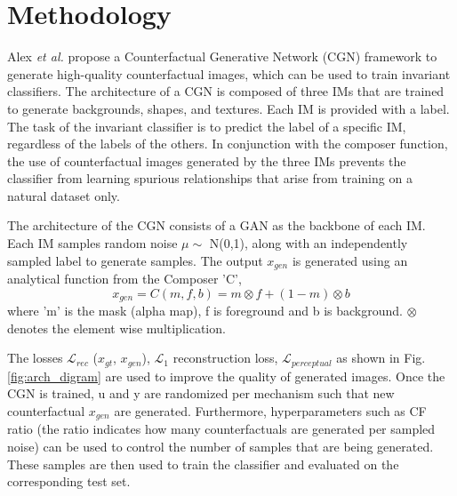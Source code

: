 \section{Methodology}
Alex \textit{et al.} \cite{sauer2021counterfactual} propose a Counterfactual Generative Network (CGN) framework to generate high-quality counterfactual images, which can be used to train invariant classifiers. The architecture of a CGN is composed of three IMs that are trained to generate backgrounds, shapes, and textures. Each IM is provided with a label. The task of the invariant classifier is to predict the label of a specific IM, regardless of the labels of the others. In conjunction with the composer function, the use of counterfactual images generated by the three IMs prevents the classifier from learning spurious relationships that arise from training on a natural dataset only.




The architecture of the CGN consists of a GAN as the backbone of each IM. 
Each IM samples random noise $\mu \sim$ N(0,1), along with an independently sampled label to generate samples. The output $x_{gen}$ is generated using an analytical function from the Composer 
'C',
$$x_{gen} = C(m,f,b) = m \otimes f + (1-m) \otimes b$$ 
where 'm' is the mask (alpha map), f is foreground and b is background. $\otimes$  denotes the element wise multiplication. 

The losses $\mathcal{L}_{rec}$ ($x_{gt}$, $x_{gen}$), $\mathcal{L}_{1}$ reconstruction loss, $\mathcal{L}_{perceptual}$ as shown in Fig. \ref{fig:arch_digram} are used to improve the quality of generated images. Once the CGN is trained, u and y are randomized per mechanism such that new counterfactual $x_{gen}$ are generated. Furthermore, hyperparameters such as CF ratio (the ratio indicates how many counterfactuals are generated per sampled noise) can be used to control the number of samples that are being generated. These samples are then used to train the classifier and evaluated on the corresponding test set. 

